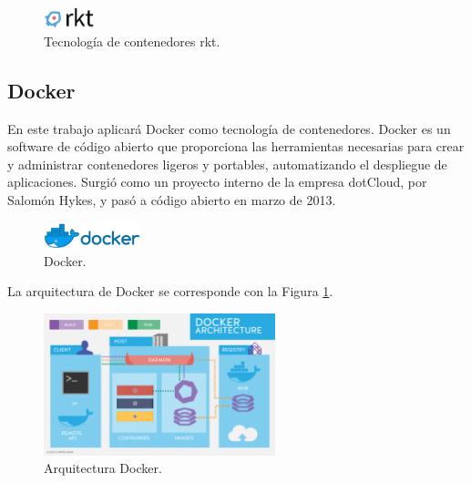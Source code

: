 \begin{figure}[H]
\centering
\includegraphics[width=0.13\textwidth]{images/figures/rkt.png}
\caption{Tecnología de contenedores rkt.\footnotemark}
\end{figure}


\subsection{Docker}\label{docker}

En este trabajo aplicará Docker como tecnología de contenedores. Docker es un software de código abierto que proporciona las herramientas necesarias para crear y administrar contenedores ligeros y portables, automatizando el despliegue de aplicaciones. Surgió como un proyecto interno de la empresa dotCloud, por Salomón Hykes, y pasó a código abierto en marzo de 2013.

\begin{figure}[H]
\centering
\includegraphics[width=0.25\textwidth]{images/figures/docker.png}
\caption{Docker.\footnotemark}
\end{figure}


La arquitectura de Docker se corresponde con la Figura \ref{fig:docker}. 

\begin{figure}[H]
\centering
\includegraphics[width=0.6\textwidth]{images/figures/dockerarchitecture.png}
\caption{Arquitectura Docker.\footnotemark \label{fig:docker}}
\end{figure}

